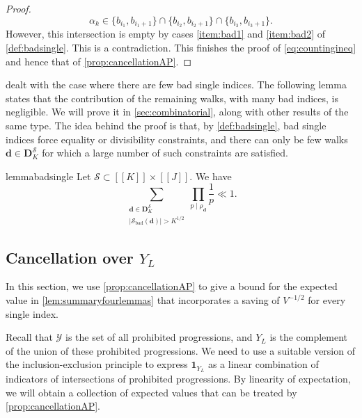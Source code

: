 \documentclass[11pt]{amsart}
\theoremstyle{definition}
\newcommand{\sinterval}[1]{[\![#1]\!] }
\newcommand{\ind}[1]{\mathbf{1}_{#1}}
\renewcommand{\d}{\boldsymbol{d}}
\newcommand{\curlyL}{V}
\newcommand{\sommespart}{b}
\newcommand{\fprod}[1]{\rho_{#1}}
\newcommand{\pall}{\fprod{\d}}
\newcommand{\s}{\mathcal{S}}
\newcommand{\fancyD}{\mathbf{D}}
\newcommand{\Ds}{\fancyD^{\s}_{\!\repK}}
\newcommand{\elln}{L}
\newcommand{\Y}{Y_{\!\elln}}
\newcommand{\prohibprog}{\mathcal{Y}}
\newcommand{\repK}{K}
\newcommand{\newK}{\sinterval{K}}
\newcommand{\newR}{\sinterval{J}}
\newcommand{\kbad}{\s_{\mathrm{bad}}(\d)}
\newcommand{\newerKR}{\newK\times\newR}
\newcommand{\littleh}{k}
\begin{document}
\begin{proof}
\begin{equation*}
\alpha_{\littleh} \in \{\sommespart_{i_1},\sommespart_{i_1+1} \} \cap \{\sommespart_{i_2},\sommespart_{i_2+1} \} \cap \{\sommespart_{i_3},\sommespart_{i_3+1} \}.
\end{equation*}
However, this intersection is empty by cases \cref{item:bad1} and \cref{item:bad2} of \cref{def:badsingle}. This is a contradiction. This finishes the proof of \cref{eq:countingineq} and hence that of \cref{prop:cancellationAP}.
\end{proof}

 dealt with the case where there are few bad single indices. The following lemma states that the contribution of the remaining walks, with many bad indices, is negligible. We will prove it in \cref{sec:combinatorial}, along with other results of the same type. The idea behind the proof is that, by \cref{def:badsingle}, bad single indices force equality or divisibility constraints, and there can only be few walks $\d\in \Ds$ for which a large number of such constraints are satisfied. 

\begin{restatable}{lemma}{badsingle}%
\label{lem:badsingle}
Let $\s\subset \newerKR$. We have
\begin{equation*}
\sum_{\substack{\d\in \Ds \\ |{\kbad}| >\repK^{1/2} }} \prod_{p\mid \pall} \frac{1}{p} \ll 1.
\end{equation*}
\end{restatable}





\subsection{Cancellation over $\Y$}
In this section, we use \cref{prop:cancellationAP} to give a bound for the expected value in \cref{lem:summaryfourlemmas} that incorporates a saving of $\curlyL^{-1/2}$ for every single index. 

Recall that $\prohibprog$ is the set of all prohibited progressions, and $\Y$ is the complement of the union of these prohibited progressions. We need to use a suitable version of the inclusion-exclusion principle to express $\ind{\Y}$ as a linear combination of indicators of intersections of prohibited progressions. By linearity of expectation, we will obtain a collection of expected values that can be treated by \cref{prop:cancellationAP}.
\end{document}
